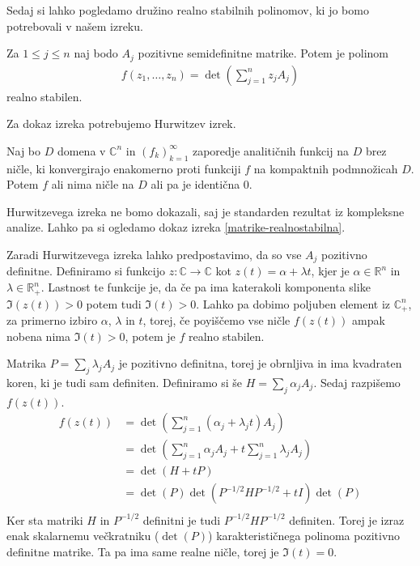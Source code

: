 Sedaj si lahko pogledamo družino realno stabilnih polinomov, ki jo bomo potrebovali v našem izreku\cite{JuliusPetter}.
\begin{izrek}\label{matrike-realnostabilna}
    Za \(1\leq j \leq n\) naj bodo \(A_j\) pozitivne semidefinitne matrike. Potem je polinom
    \begin{align*}
        f(z_1, \ldots, z_n) = \det\left(\sum_{j=1}^n z_j A_j\right)
    \end{align*}
    realno stabilen.
\end{izrek}
Za dokaz izreka potrebujemo Hurwitzev izrek\cite{freitag1}.
\begin{izrek}\label{hurwitz}
    Naj bo \(D\) domena v \(\mathbb C^n\) in \((f_k)_{k=1}^\infty\) zaporedje analitičnih funkcij na \(D\) brez ničle, ki konvergirajo enakomerno proti funkciji \(f\) na kompaktnih podmnožicah \(D\). Potem \(f\) ali nima ničle na \(D\) ali pa je identična \(0\).
\end{izrek}
Hurwitzevega izreka ne bomo dokazali, saj je standarden rezultat iz kompleksne analize. Lahko pa si ogledamo dokaz izreka \ref{matrike-realnostabilna}.
\begin{dokaz}
    Zaradi Hurwitzevega izreka lahko predpostavimo, da so vse \(A_j\) pozitivno definitne. Definiramo si funkcijo \(z: \mathbb C\to \mathbb C\) kot \(z(t) = \alpha + \lambda t\), kjer je \(\alpha\in \mathbb R^n\) in \(\lambda \in \mathbb R_+^n\). Lastnost te funkcije je, da če pa ima katerakoli komponenta slike \(\Im(z(t))>0\) potem tudi \(\Im(t)>0\). Lahko pa dobimo poljuben element iz \(\mathbb C_+^n\), za primerno izbiro \(\alpha\), \(\lambda\) in \(t\), torej, če poyiščemo vse ničle \(f(z(t))\) ampak nobena nima \(\Im(t)>0\), potem je \(f\) realno stabilen. 
    
    Matrika \(P = \sum_j \lambda_j A_j\) je pozitivno definitna, torej je obrnljiva in ima kvadraten koren, ki je tudi sam definiten. Definiramo si še \(H = \sum_j \alpha_j A_j\). Sedaj razpišemo \(f(z(t))\).
    \begin{align*}
        f(z(t)) &= \det\left(\sum_{j=1}^n (\alpha_j + \lambda_j t) A_j\right)\\
        &= \det\left(\sum_{j=1}^n \alpha_j A_j + t\sum_{j=1}^n \lambda_j A_j\right)\\
        &= \det\left(H+ tP\right)\\
        &= \det\left(P\right)\det\left(P^{-1/2}HP^{-1/2} + tI\right) \det\left(P\right)\\
    \end{align*}
    Ker sta matriki \(H\) in \(P^{-1/2}\) definitni je tudi \(P^{-1/2}HP^{-1/2}\) definiten. Torej je izraz enak skalarnemu večkratniku (\(\det(P)\)) karakterističnega polinoma pozitivno definitne matrike. Ta pa ima same realne ničle, torej je \(\Im(t)=0\).
\end{dokaz}

